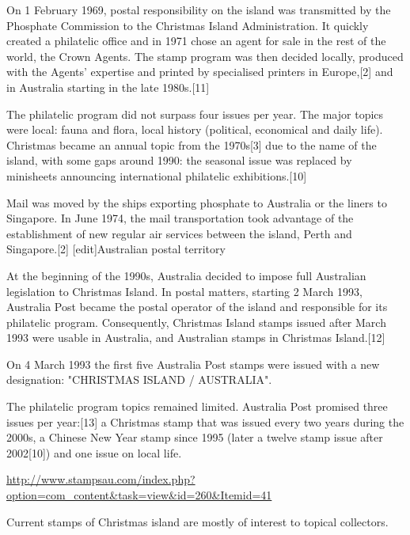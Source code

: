 On 1 February 1969, postal responsibility on the island was transmitted by the Phosphate Commission to the Christmas Island Administration. It quickly created a philatelic office and in 1971 chose an agent for sale in the rest of the world, the Crown Agents. The stamp program was then decided locally, produced with the Agents' expertise and printed by specialised printers in Europe,[2] and in Australia starting in the late 1980s.[11]

The philatelic program did not surpass four issues per year. The major topics were local: fauna and flora, local history (political, economical and daily life). Christmas became an annual topic from the 1970s[3] due to the name of the island, with some gaps around 1990: the seasonal issue was replaced by minisheets announcing international philatelic exhibitions.[10]

Mail was moved by the ships exporting phosphate to Australia or the liners to Singapore. In June 1974, the mail transportation took advantage of the establishment of new regular air services between the island, Perth and Singapore.[2]
[edit]Australian postal territory

At the beginning of the 1990s, Australia decided to impose full Australian legislation to Christmas Island. In postal matters, starting 2 March 1993, Australia Post became the postal operator of the island and responsible for its philatelic program. Consequently, Christmas Island stamps issued after March 1993 were usable in Australia, and Australian stamps in Christmas Island.[12]



On 4 March 1993 the first five Australia Post stamps were issued with a new designation: "CHRISTMAS ISLAND / AUSTRALIA". 

The philatelic program topics remained limited. Australia Post promised 
three issues per year:[13] a Christmas stamp that was issued every 
two years during the 2000s, a Chinese New Year stamp since 
1995 (later a twelve stamp issue after 2002[10]) and one issue on local life.


\url{http://www.stampsau.com/index.php?option=com_content&task=view&id=260&Itemid=41}

Current stamps of Christmas island are mostly of interest to topical collectors.

                                        